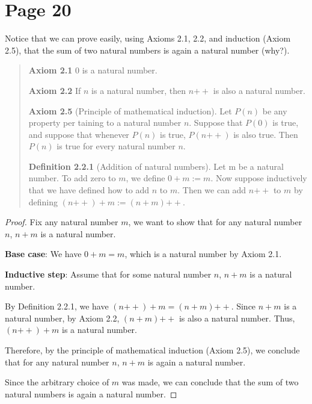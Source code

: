 \documentclass{article}
\newcommand{\doubleplus}{\mathbin{{+}{+}}}
\begin{document}
\section{Page 20}
Notice that we can prove easily, using Axioms 2.1, 2.2, and induction (Axiom
2.5), that the sum of two natural numbers is again a natural number (why?).

\begin{quotation}

    \textbf{Axiom 2.1} $0$ is a natural number.

    \textbf{Axiom 2.2} If $n$ is a natural number, then $n\doubleplus$ is also a natural number.

    \textbf{Axiom 2.5} (Principle of mathematical induction). Let $P(n)$ be any property per
    taining to a natural number $n$. Suppose that $P(0)$ is true, and suppose that whenever
    $P(n)$ is true, $P(n\doubleplus)$ is also true. Then $P(n)$ is true for every natural number $n$.

    \textbf{Definition 2.2.1} (Addition of natural numbers). Let m be a natural number. To add
    zero to $m$, we define $0 +m := m$.
    Now suppose inductively that we have defined how to add $n$ to $m$.
    Then we can add $n\doubleplus$ to $m$ by defining $(n\doubleplus)+m := (n +m)\doubleplus$.

\end{quotation}

\begin{proof}
    Fix any natural number $m$,
    we want to show that for any natural number $n$, $n + m$ is a natural number.

    \textbf{Base case}:  We have $0 + m = m$, which is a natural number by Axiom 2.1.

    \textbf{Inductive step}: Assume that for some natural number $n$, $n + m$ is a natural number.

    By Definition 2.2.1, we have $(n\doubleplus) + m = (n + m) \doubleplus$.
    Since $n + m$ is a natural number, by Axiom 2.2, $(n + m) \doubleplus$ is also a natural number.
    Thus, $(n\doubleplus) + m$ is a natural number.

    Therefore, by the principle of mathematical induction (Axiom 2.5),
    we conclude that for any natural number $n$, $n+m$ is again a natural number.

    Since the arbitrary choice of $m$ was made,
    we can conclude that the sum of two natural numbers is again a natural number.

\end{proof}
\end{document}
